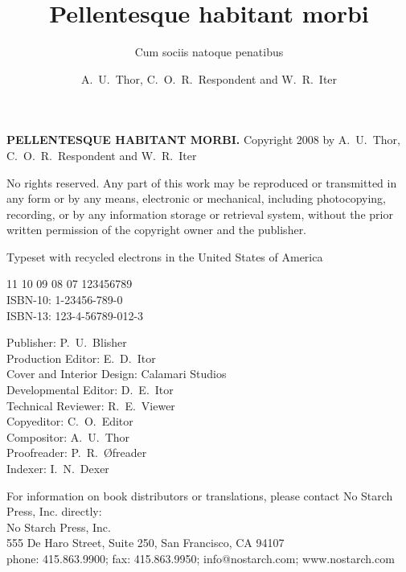 \documentclass[cfonts]{nostarch}
\begin{document}
\frontmatter

\author{A.~U.~Thor, C.~O.~R.~Respondent and W.~R.~Iter}

\title{Pellentesque habitant morbi}

\subtitle{Cum sociis natoque penatibus}


\makehalftitle

\maketitle


\begin{copyrightpage}
  \textbf{\sffamily\MakeUppercase{Pellentesque habitant morbi.}}
  Copyright \textcopyright{} 2008 by A.~U.~Thor, C.~O.~R.~Respondent
  and W.~R.~Iter

  No rights reserved. Any part of this work may be reproduced or
  transmitted in any form or by any means, electronic or mechanical,
  including photocopying, recording, or by any information storage or
  retrieval system, without the prior written permission of the
  copyright owner and the publisher.

   Typeset
  with recycled electrons in the United States of America

11 10 09 08 07 \hspace{0.5in}  123456789\\
ISBN-10: 1-23456-789-0\\
ISBN-13: 123-4-56789-012-3

Publisher: P.~U.~Blisher\\
Production Editor: E.~D.~Itor\\
Cover and Interior Design: Calamari Studios\\
Developmental Editor: D.~E.~Itor\\
Technical Reviewer: R.~E.~Viewer\\
Copyeditor: C.~O.~Editor\\
Compositor: A.~U.~Thor\\
Proofreader: P.~R.~\O freader\\
Indexer: I.~N.~Dexer

For information on book distributors or translations, please contact
No Starch Press, Inc. directly: \\
No Starch Press, Inc.\\
555 De Haro Street, Suite 250, San Francisco, CA 94107\\
phone: 415.863.9900; fax: 415.863.9950; info@nostarch.com; www.nostarch.com\\


\end{copyrightpage}
\end{document}
